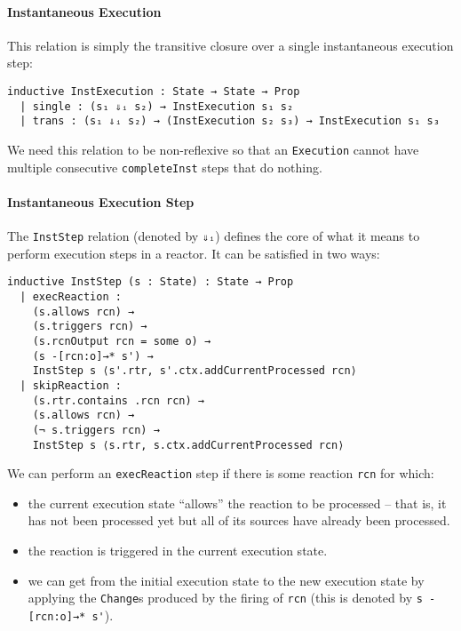\paragraph{Instantaneous Execution}

This relation is simply the transitive closure over a single instantaneous execution step:

\begin{lstlisting}
inductive InstExecution : State → State → Prop 
  | single : (s₁ ⇓ᵢ s₂) → InstExecution s₁ s₂
  | trans : (s₁ ⇓ᵢ s₂) → (InstExecution s₂ s₃) → InstExecution s₁ s₃
\end{lstlisting}

We need this relation to be non-reflexive so that an \lstinline{Execution} cannot have multiple consecutive \lstinline{completeInst} steps that do nothing.

\paragraph{Instantaneous Execution Step}
\label{par:inst-exec-step}

The \lstinline{InstStep} relation (denoted by \lstinline{⇓ᵢ}) defines the core of what it means to perform execution steps in a reactor.
It can be satisfied in two ways:

\begin{lstlisting}
inductive InstStep (s : State) : State → Prop 
  | execReaction : 
    (s.allows rcn) →
    (s.triggers rcn) →
    (s.rcnOutput rcn = some o) →
    (s -[rcn:o]→* s') →
    InstStep s ⟨s'.rtr, s'.ctx.addCurrentProcessed rcn⟩
  | skipReaction :
    (s.rtr.contains .rcn rcn) →
    (s.allows rcn) →
    (¬ s.triggers rcn) →
    InstStep s ⟨s.rtr, s.ctx.addCurrentProcessed rcn⟩
\end{lstlisting}

We can perform an \lstinline{execReaction} step if there is some reaction \lstinline{rcn} for which:

\begin{itemize}
  \item the current execution state ``allows'' the reaction to be processed -- that is, it has not been processed yet but all of its sources have already been processed.
  \item the reaction is triggered in the current execution state.
  \item we can get from the initial execution state to the new execution state by applying the \lstinline{Change}s produced by the firing of \lstinline{rcn} (this is denoted by \lstinline{s -[rcn:o]→* s'}).
\end{itemize}

